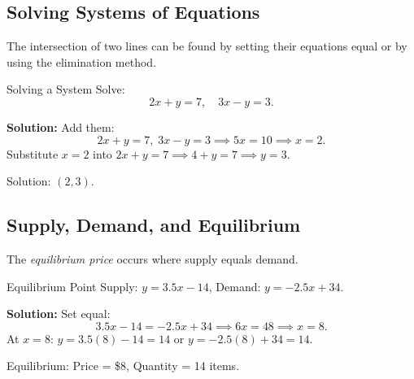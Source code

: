 \subsection*{Solving Systems of Equations}
The intersection of two lines can be found by setting their equations equal or by using the elimination method.

\begin{example}{Solving a System}\label{exa:system-solve}
Solve:
\[
2x+y=7,\quad 3x-y=3.
\]

\textbf{Solution:} Add them:
\[
2x+y=7,\;3x-y=3 \implies 5x=10 \implies x=2.
\]
Substitute $x=2$ into $2x+y=7 \implies 4+y=7 \implies y=3.$

Solution: $(2,3)$.
\end{example}

\subsection*{Supply, Demand, and Equilibrium}
The \emph{equilibrium price} occurs where supply equals demand.

\begin{example}{Equilibrium Point}\label{exa:equilibrium}
Supply: $y=3.5x-14$, Demand: $y=-2.5x+34$.

\textbf{Solution:} Set equal:
\[
3.5x-14=-2.5x+34 \implies 6x=48 \implies x=8.
\]
At $x=8$: $y=3.5(8)-14=14$ or $y=-2.5(8)+34=14$.

Equilibrium: Price = \$8, Quantity = 14 items.

\begin{center}
\par{}\label{fig:equations-and-lines-new-tikz09}%

\end{center}
\end{example}

